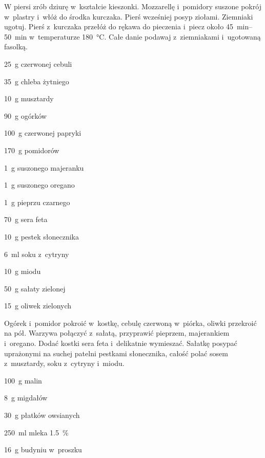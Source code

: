 \documentclass[../kucharek.tex]{subfiles}
\begin{document}
W piersi zrób dziurę w~kształcie kieszonki. Mozzarellę i~pomidory suszone
pokrój w~plastry i~włóż do środka kurczaka. Pierś wcześniej posyp ziołami.
Ziemniaki ugotuj. Pierś z~kurczaka przełóż do rękawa do pieczenia i~piecz około
\qtyrange{45}{50}{\minute} w~temperaturze \qty{180}{\celsius}. Całe danie
podawaj z~ziemniakami i~ugotowaną fasolką.


\begin{Ingred}
    \item \qty{25}{\gram} czerwonej cebuli
    \item \qty{35}{\gram} chleba żytniego
    \item \qty{10}{\gram} musztardy
    \item \qty{90}{\gram} ogórków
    \item \qty{100}{\gram} czerwonej papryki
    \item \qty{170}{\gram} pomidorów
    \item \qty{1}{\gram} suszonego majeranku
    \item \qty{1}{\gram} suszonego oregano
    \item \qty{1}{\gram} pieprzu czarnego
    \item \qty{70}{\gram} sera feta
    \item \qty{10}{\gram} pestek słonecznika
    \item \qty{6}{\milli\litre} soku z~cytryny
    \item \qty{10}{\gram} miodu
    \item \qty{50}{\gram} sałaty zielonej
    \item \qty{15}{\gram} oliwek zielonych
\end{Ingred}

Ogórek i~pomidor pokroić w~kostkę, cebulę czerwoną w~piórka, oliwki przekroić
na pół. Warzywa połączyć z~sałatą, przyprawić pieprzem, majerankiem i~oregano.
Dodać kostki sera feta i~delikatnie wymieszać. Sałatkę posypać uprażonymi na
suchej patelni pestkami słonecznika, całość polać sosem z~musztardy, soku
z~cytryny i~miodu.


\begin{Ingred}
    \item \qty{100}{\gram} malin
    \item \qty{8}{\gram} migdałów
    \item \qty{30}{\gram} płatków owsianych
    \item \qty{250}{\milli\litre} mleka \qty{1.5}{\percent}
    \item \qty{16}{\gram} budyniu w~proszku
\end{Ingred}
\end{document}
